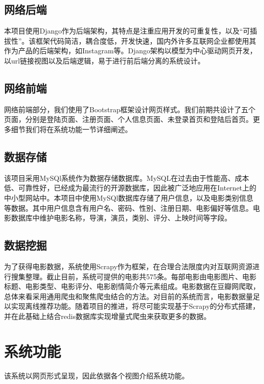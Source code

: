 \documentclass{ctexart}
\begin{document}
\subsection{网络后端}
本项目使用Django作为后端架构，其特点是注重应用开发的可重复性，以及“可插拔性”。该框架代码简洁，耦合度低，开发快速，国内外许多互联网企业都使用其作为产品的后端架构，如Instagram等。Django架构以模型为中心驱动网页开发，以url链接视图以及后端逻辑，易于进行前后端分离的系统设计。

\subsection{网络前端}
网络前端部分，我们使用了Bootstrap框架设计网页样式。我们前期共设计了五个页面，分别是登陆页面、注册页面、个人信息页面、未登录首页和登陆后首页。更多细节我们将在系统功能一节详细阐述。

\subsection{数据存储}
该项目采用MySQl系统作为数据存储数据库。MySQL在过去由于性能高、成本低、可靠性好，已经成为最流行的开源数据库，因此被广泛地应用在Internet上的中小型网站中。本项目中使用MySQl数据库存储了用户信息，以及电影类别信息等数据。其中用户信息含有用户名、密码、性别、注册日期、电影偏好等信息。电影数据库中维护电影名称，导演，演员，类别、评分、上映时间等字段。

\subsection{数据挖掘}
为了获得电影数据，系统使用Scrapy作为框架，在合理合法限度内对互联网资源进行搜集整理。截止目前，系统可提供的电影共575条。每部电影由电影图片、电影标题、电影类型、电影评分、电影剧情简介等元素组成。电影数据在豆瓣网爬取，总体来看采用通用爬虫和聚焦爬虫结合的方法。对目前的系统而言，电影数据量足以实现离线推荐功能。随着项目的推进，将尽可能实现基于Scrapy的分布式搭建，并在此基础上结合redis数据库实现增量式爬虫来获取更多的数据。

\section{系统功能}
该系统以网页形式呈现，因此依据各个视图介绍系统功能。
\end{document}

